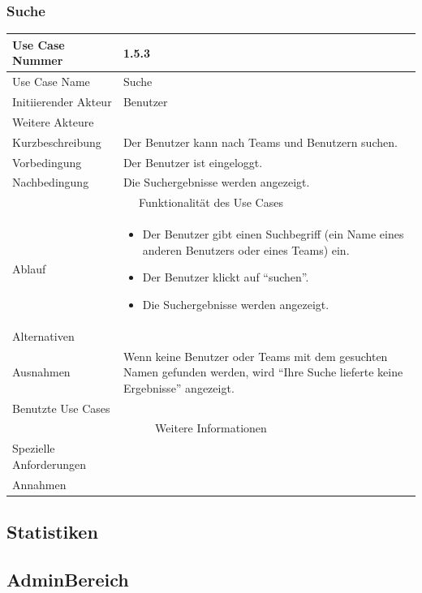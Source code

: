 \documentclass[10pt,a4paper]{article}
\begin{document}
\subsubsection{Suche}
	\begin{tabular}{|l|p{.5\linewidth}|}
	\hline Use Case Nummer & 1.5.3 \\ 
	\hline Use Case Name & Suche \\ 
	\hline Initiierender Akteur & Benutzer \\
	\hline Weitere Akteure &  \\
	\hline Kurzbeschreibung & Der Benutzer kann nach Teams und Benutzern suchen. \\
	\hline Vorbedingung & Der Benutzer ist eingeloggt. \\
	\hline Nachbedingung & Die Suchergebnisse werden angezeigt. \\
	\hline \multicolumn{2}{|c|}{Funktionalität des Use Cases}\\
	\hline Ablauf & \begin{itemize}
		\item Der Benutzer gibt einen Suchbegriff (ein Name eines anderen Benutzers oder eines Teams) ein.
		\item Der Benutzer klickt auf ``suchen''.
		\item Die Suchergebnisse werden angezeigt.
	\end{itemize} \\
	\hline Alternativen &  \\
	\hline Ausnahmen & Wenn keine Benutzer oder Teams mit dem gesuchten Namen gefunden werden, wird ``Ihre Suche lieferte keine Ergebnisse'' angezeigt. \\
	\hline Benutzte Use Cases &  \\
	\hline \multicolumn{2}{|c|}{Weitere Informationen} \\
	\hline Spezielle Anforderungen &  \\
	\hline Annahmen &  \\
	\hline
	\end{tabular}

\subsection{Statistiken}
\subsection{AdminBereich}
\end{document}
